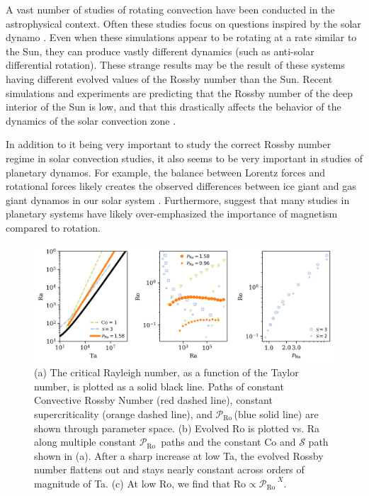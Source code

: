 \documentclass[twocolumn, amsmath, amsfonts, amssymb]{aastex62}
\newcommand{\pro}{\ensuremath{\mathcal{P}_{\text{Ro}}\,}}
\begin{document}
A vast number of studies of rotating convection have been conducted in the astrophysical context.
Often these studies focus on questions inspired by the solar dynamo
\citep{glatzmaier&gilman1982, busse2002, brown&all2008,
brown&all2010, brown&all2011, augustson&all2012, guerrero&all2013, kapyla&all2014}.
Even when these simulations appear to be rotating at a rate similar to the Sun,
they can produce vastly different dynamics (such as anti-solar differential rotation).
These strange results may be the result of these systems having different evolved
values of the Rossby number than the Sun. Recent simulations and experiments are predicting
that the Rossby number of the deep interior of the Sun is low, and that this drastically
affects the behavior of the dynamics of the solar convection zone
\citep{featherstone&hindman2016, greer&all2016}.

In addition to it being very important to study the correct Rossby number
regime in solar convection studies, it also seems to be very important in
studies of planetary dynamos. For example, the balance between Lorentz forces
and rotational forces likely creates the observed differences between ice
giant and gas giant dynamos in our solar system \citep{soderlund&all2015}.
Furthermore, \cite{aurnou&king2017} suggest that many studies in planetary systems
have likely over-emphasized the importance of magnetism compared to rotation.

\begin{figure}[t!]
\includegraphics[width=\textwidth]{./figs/parameter_space.png}
\caption{(a) The critical Rayleigh number, as a function of the Taylor number, 
is plotted as a solid black line. Paths of constant Convective Rossby Number
(red dashed line), constant supercriticality (orange dashed line), and 
\pro (blue solid line) are shown through parameter space. (b) Evolved
Ro is plotted vs. Ra along multiple constant \pro
paths and the constant Co and $\mathcal{S}$ path shown in (a).
After a sharp increase at low Ta, the evolved Rossby number flattens
out and stays nearly constant across orders of magnitude of Ta.
(c) At low Ro, we find that $\text{Ro} \propto \pro^X$.
\label{fig:parameter_space} }
\end{figure}
\end{document}
